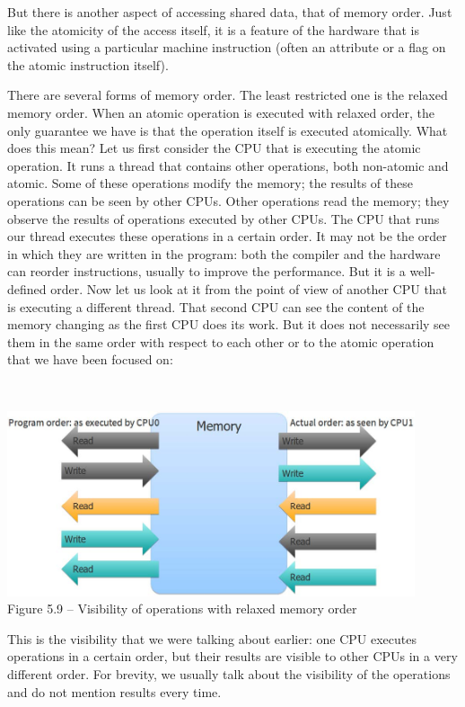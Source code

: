 But there is another aspect of accessing shared data, that of memory order. Just like the atomicity of the access itself, it is a feature of the hardware that is activated using a particular machine instruction (often an attribute or a flag on the atomic instruction itself).

There are several forms of memory order. The least restricted one is the relaxed memory order. When an atomic operation is executed with relaxed order, the only guarantee we have is that the operation itself is executed atomically. What does this mean? Let us first consider the CPU that is executing the atomic operation. It runs a thread that contains other operations, both non-atomic and atomic. Some of these operations modify the memory; the results of these operations can be seen by other CPUs. Other operations read the memory; they observe the results of operations executed by other CPUs. The CPU that runs our thread executes these operations in a certain order. It may not be the order in which they are written in the program: both the compiler and the hardware can reorder instructions, usually to improve the performance. But it is a well-defined order. Now let us look at it from the point of view of another CPU that is executing a different thread. That second CPU can see the content of the memory changing as the first CPU does its work. But it does not necessarily see them in the same order with respect to each other or to the atomic operation that we have been focused on:

\hspace*{\fill} \\ %
\begin{center}
\includegraphics[width=0.9\textwidth]{content/1/chapter5/images/9.jpg}\\
Figure 5.9 – Visibility of operations with relaxed memory order
\end{center}

This is the visibility that we were talking about earlier: one CPU executes operations in a certain order, but their results are visible to other CPUs in a very different order. For brevity, we usually talk about the visibility of the operations and do not mention results every time.

